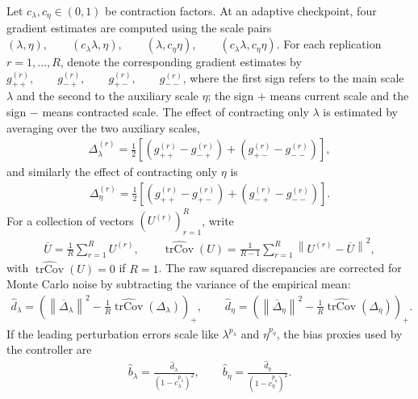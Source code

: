 Let $c_\lambda,c_\eta\in(0,1)$ be contraction factors. At an adaptive checkpoint, four gradient estimates are computed using the scale pairs $(\lambda,\eta), \qquad (c_\lambda\lambda,\eta), \qquad (\lambda,c_\eta\eta), \qquad (c_\lambda\lambda,c_\eta\eta)$.
For each replication $r=1,\ldots,R$, denote the corresponding gradient estimates by $g_{++}^{(r)},\qquad g_{-+}^{(r)},\qquad g_{+-}^{(r)},\qquad g_{--}^{(r)}$,
where the first sign refers to the main scale $\lambda$ and the second to the auxiliary scale $\eta$; the sign $+$ means current scale and the sign $-$ means contracted scale. The effect of contracting only $\lambda$ is estimated by averaging over the two auxiliary scales,
\begin{align}
    \Delta_\lambda^{(r)}
    =
    \frac12
    \left[
        \left(g_{++}^{(r)}-g_{-+}^{(r)}\right)
        +
        \left(g_{+-}^{(r)}-g_{--}^{(r)}\right)
    \right],
\end{align}
and similarly the effect of contracting only $\eta$ is
\begin{align}
    \Delta_\eta^{(r)}
    =
    \frac12
    \left[
        \left(g_{++}^{(r)}-g_{+-}^{(r)}\right)
        +
        \left(g_{-+}^{(r)}-g_{--}^{(r)}\right)
    \right].
\end{align}
For a collection of vectors $(U^{(r)})_{r=1}^R$, write
\begin{align}
    \overline U
    =
    \frac1R\sum_{r=1}^R U^{(r)},
    \qquad
    \widehat{\operatorname{trCov}}(U)
    =
    \frac1{R-1}
    \sum_{r=1}^R
    \left\|
        U^{(r)}-\overline U
    \right\|^2,
\end{align}
with $\widehat{\operatorname{trCov}}(U)=0$ if $R=1$. The raw squared discrepancies are corrected for Monte Carlo noise by subtracting the variance of the empirical mean:
\begin{align}
    \widehat d_\lambda
    =
    \left(
        \left\|\overline\Delta_\lambda\right\|^2
        -
        \frac1R
        \widehat{\operatorname{trCov}}(\Delta_\lambda)
    \right)_+,
    \qquad
    \widehat d_\eta
    =
    \left(
        \left\|\overline\Delta_\eta\right\|^2
        -
        \frac1R
        \widehat{\operatorname{trCov}}(\Delta_\eta)
    \right)_+.
\end{align}
If the leading perturbation errors scale like $\lambda^{p_\lambda}$ and $\eta^{p_\eta}$, the bias proxies used by the controller are
\begin{align}
    \widehat b_\lambda
    =
    \frac{\widehat d_\lambda}
    {(1-c_\lambda^{p_\lambda})^2},
    \qquad
    \widehat b_\eta
    =
    \frac{\widehat d_\eta}
    {(1-c_\eta^{p_\eta})^2}.
\end{align}
